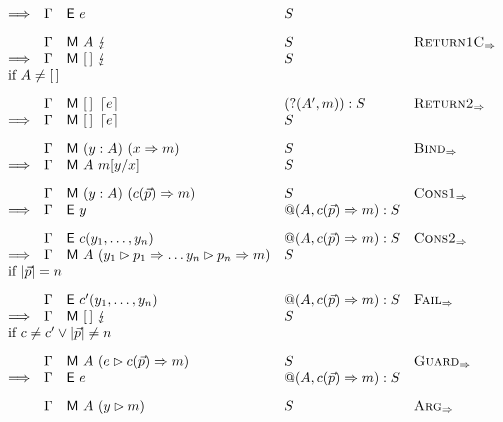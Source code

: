\begin{figure*}
\[\begin{array}{rllll}
      \Longrightarrow & \Gamma & \eval{e} & \retstack & \\[2ex]
      & \Gamma & \match {\argstack}{\matchfail} & \retstack & \smallrule{Return1C} \\
      \Longrightarrow & \Gamma & \match{[\,]}{\matchfail} & \retstack \\
      \multicolumn{5}{l}{\text{if}~\argstack \neq [\,]} \\[2ex]
      & \Gamma & \match {[\,]}{\matchreturn{e}} & (?(\argstack',m)):\retstack & \smallrule{Return2} \\
      \Longrightarrow & \Gamma & \match {[\,]}{\matchreturn{e}} & \retstack\\[2ex]
      & \Gamma & \match {(y:\argstack)} {(\matchpat{x}{m})}  & \retstack & \smallrule{Bind} \\
      \Longrightarrow & \Gamma & \match{\argstack}{m[y/x]}  & \retstack & \\[2ex]
      & \Gamma & \match  {(y:\argstack)}{(\matchpat{\constr{c}{\vec{p}}}{m})}  & \retstack & \smallrule{Cons1} \\
      \Longrightarrow & \Gamma & \eval y  & @(\argstack,\matchpat{\constr{c}{\vec{p}}}{m}):\retstack & \\[2ex]
      & \Gamma & \eval \constr{c}{y_1,\ldots,y_n}  & @(\argstack,\matchpat{\constr{c}{\vec{p}}}{m}):\retstack &  \smallrule{Cons2} \\
      \Longrightarrow & \Gamma & \match{\argstack}{(\matcharg{y_1}{p_1} \amatchpat \ldots \matcharg{y_n}{p_n} \amatchpat m)}  & \retstack \\
      \multicolumn{5}{l}{\text{if}~ |\vec{p}|=n} \\[2ex]
      & \Gamma & \eval \constr{c'}{y_1,\ldots,y_n} & @(\argstack,\matchpat{\constr{c}{\vec{p}}}{m}):\retstack &  \smallrule{Fail} \\
      \Longrightarrow & \Gamma & \match {[\,]}{\matchfail}  &  \retstack \\
      \multicolumn{5}{l}{\text{if}~ c\neq c' \lor |\vec{p}|\neq n} \\[2ex]
      & \Gamma & \match {\argstack}{(\matcharg{e}{\matchpat{\constr{c}{\vec{p}}}{m}})} & \retstack & \smallrule{Guard} \\
      \Longrightarrow & \Gamma & \eval e  & @(\argstack,\matchpat{\constr{c}{\vec{p}}}{m}):\retstack & \\[2ex]
      & \Gamma & \match{\argstack}{(\matcharg{y}{m})} & \retstack & \smallrule{Arg} \\

\end{array}\]
\end{figure*}
